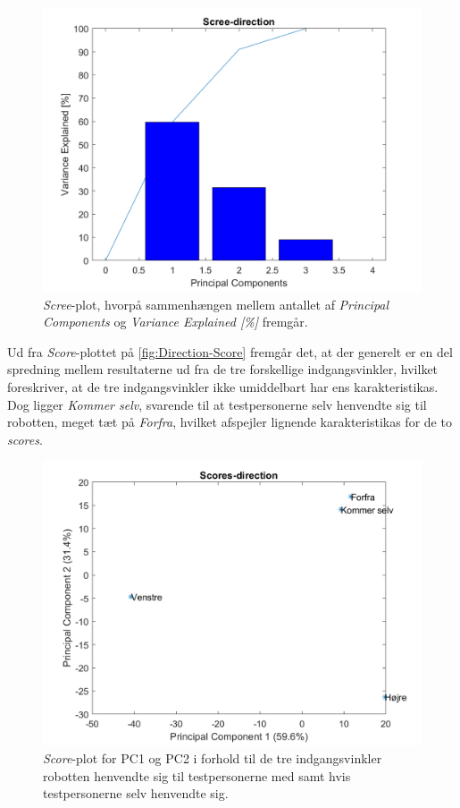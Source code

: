 \begin{figure}[H]
\centering
\includegraphics[width=\textwidth]{Figure/DatabehandlingSkalaer/PCAfigures/Direction-Scree.png}
\caption{\textit{Scree}-plot, hvorpå sammenhængen mellem antallet af \textit{Principal Components} og \textit{Variance Explained [\%]} fremgår.}
\label{fig:Direction-Scree}
\end{figure}
\noindent
% 
Ud fra \textit{Score}-plottet på \autoref{fig:Direction-Score} fremgår det, at der generelt er en del spredning mellem resultaterne ud fra de tre forskellige indgangsvinkler, hvilket foreskriver, at de tre indgangsvinkler ikke umiddelbart har ens karakteristikas. Dog ligger \textit{Kommer selv}, svarende til at testpersonerne selv henvendte sig til robotten, meget tæt på \textit{Forfra}, hvilket afspejler lignende karakteristikas for de to \textit{scores}. 
%
\begin{figure}[H]
\centering
\includegraphics[width=\textwidth]{Figure/DatabehandlingSkalaer/PCAfigures/Direction-Scores}
\caption{\textit{Score}-plot for PC1 og PC2 i forhold til de tre indgangsvinkler robotten henvendte sig til testpersonerne med samt hvis testpersonerne selv henvendte sig.}
\label{fig:Direction-Score}
\end{figure}
